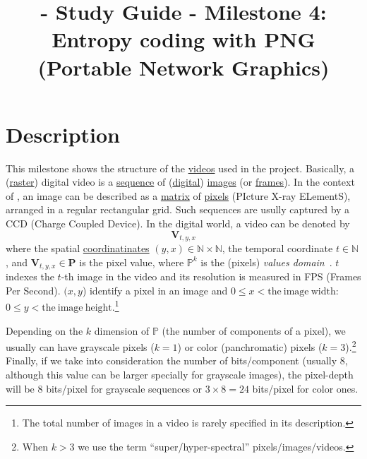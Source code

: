 
\title{\SM{} - Study Guide - Milestone 4: Entropy coding with PNG (Portable Network Graphics)}

\maketitle

\tableofcontents

\section{Description}

This milestone shows the structure of the
\href{https://en.wikipedia.org/wiki/Video}{videos} used in the
\theproject{} project. Basically, a
(\href{https://en.wikipedia.org/wiki/Raster}{raster}) digital video is
a \href{https://en.wikipedia.org/wiki/Sequence}{sequence} of
(\href{https://en.wikipedia.org/wiki/Digital_data}{digital})
\href{https://en.wikipedia.org/wiki/Image}{images} (or
\href{https://en.wikipedia.org/wiki/Film_frame}{frames}). In the
context of \theproject{}, an image can be described as a
\href{https://en.wikipedia.org/wiki/Matrix_(mathematics)}{matrix} of
\href{https://en.wikipedia.org/wiki/Pixel}{pixels} (PIcture X-ray
ELementS), arranged in a regular rectangular grid. Such sequences are
usully captured by a CCD (Charge Coupled Device). In the digital
world, a video can be denoted by
\begin{equation*}
  \mathbf{V}_{t,y,x}
\end{equation*}
where the spatial
\href{https://en.wikipedia.org/wiki/Coordinate_system}{coordinatinates}
$(y,x)\in\mathbb{N}\times\mathbb{N}$, the temporal coordinate
$t\in\mathbb{N}$, and $\mathbf{V}_{t,y,x}\in\mathbf{P}$ is the pixel
value, where $\mathbb{P}^{k}$ is the (pixels) \emph{values
  domain}~\cite{burger2016digital}. $t$ indexes the $t$-th image in
the video and its resolution is measured in FPS (Frames Per
Second). $(x,y$) identify a pixel in an image and
$0\le x< \mathrm{the~image~width}$:
$0\le y< \mathrm{the~image~height}$.\footnote{The total number of
  images in a video is rarely specified in its description.}

Depending on the $k$ dimension of $\mathbb{P}$ (the number of
components of a pixel), we usually can have grayscale pixels ($k=1$)
or color (panchromatic) pixels ($k=3$).\footnote{When $k>3$ we use the
  term ``super/hyper-spectral'' pixels/images/videos.} Finally, if we
take into consideration the number of bits/component (usually 8,
although this value can be larger specially for grayscale images), the
pixel-depth will be 8 bits/pixel for grayscale sequences or
$3\times 8=24$ bits/pixel for color ones.

